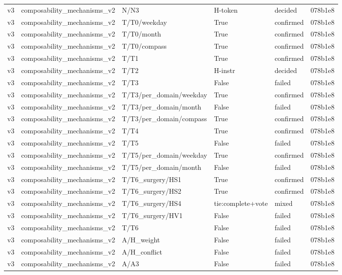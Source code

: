 \begin{longtable}{llllll}
v3 & composability\_mechanisms\_v2 & N/N3 & H-token & decided & 078b1e8 \\
v3 & composability\_mechanisms\_v2 & T/T0/weekday & True & confirmed & 078b1e8 \\
v3 & composability\_mechanisms\_v2 & T/T0/month & True & confirmed & 078b1e8 \\
v3 & composability\_mechanisms\_v2 & T/T0/compass & True & confirmed & 078b1e8 \\
v3 & composability\_mechanisms\_v2 & T/T1 & True & confirmed & 078b1e8 \\
v3 & composability\_mechanisms\_v2 & T/T2 & H-instr & decided & 078b1e8 \\
v3 & composability\_mechanisms\_v2 & T/T3 & False & failed & 078b1e8 \\
v3 & composability\_mechanisms\_v2 & T/T3/per\_domain/weekday & True & confirmed & 078b1e8 \\
v3 & composability\_mechanisms\_v2 & T/T3/per\_domain/month & False & failed & 078b1e8 \\
v3 & composability\_mechanisms\_v2 & T/T3/per\_domain/compass & True & confirmed & 078b1e8 \\
v3 & composability\_mechanisms\_v2 & T/T4 & True & confirmed & 078b1e8 \\
v3 & composability\_mechanisms\_v2 & T/T5 & False & failed & 078b1e8 \\
v3 & composability\_mechanisms\_v2 & T/T5/per\_domain/weekday & True & confirmed & 078b1e8 \\
v3 & composability\_mechanisms\_v2 & T/T5/per\_domain/month & False & failed & 078b1e8 \\
v3 & composability\_mechanisms\_v2 & T/T6\_surgery/HS1 & True & confirmed & 078b1e8 \\
v3 & composability\_mechanisms\_v2 & T/T6\_surgery/HS2 & True & confirmed & 078b1e8 \\
v3 & composability\_mechanisms\_v2 & T/T6\_surgery/HS4 & tie:complete+vote & mixed & 078b1e8 \\
v3 & composability\_mechanisms\_v2 & T/T6\_surgery/HV1 & False & failed & 078b1e8 \\
v3 & composability\_mechanisms\_v2 & T/T6 & False & failed & 078b1e8 \\
v3 & composability\_mechanisms\_v2 & A/H\_weight & False & failed & 078b1e8 \\
v3 & composability\_mechanisms\_v2 & A/H\_conflict & False & failed & 078b1e8 \\
v3 & composability\_mechanisms\_v2 & A/A3 & False & failed & 078b1e8 \\

\end{longtable}

